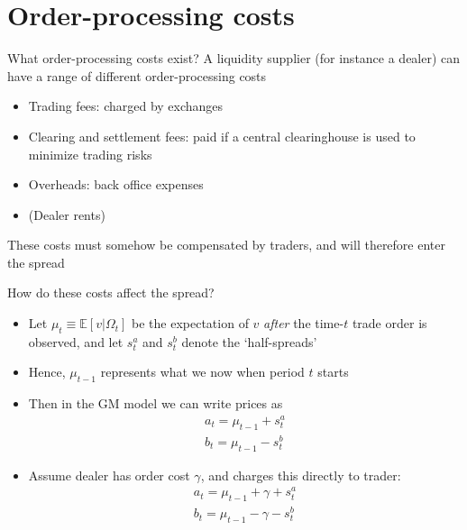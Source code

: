 \documentclass[english,10pt
,aspectratio=169
]{beamer}
\begin{document}
\section{Order-processing costs}

\begin{frame}{What order-processing costs exist?}
	A liquidity supplier (for instance a dealer) can have a range of different order-processing costs
	\begin{itemize}
		\item Trading fees:  charged by exchanges
		\item Clearing and settlement fees:  paid if a central clearinghouse is used to minimize trading risks
		\item Overheads: back office expenses
		\item (Dealer rents)
	\end{itemize}
	These costs must somehow be compensated by traders, and will therefore enter the spread
\end{frame}


\begin{frame}{How do these costs affect the spread?}
	\begin{itemize}
		\item Let $\mu_t \equiv \mathbb{E}[v | \Omega_t]$ be the expectation of $v$ \textit{after} the time-$t$ trade order is observed, and let $s^a_t$ and $s^b_t$ denote the `half-spreads'
		\item Hence, $\mu_{t-1}$ represents what we now when period $t$ starts
		\item  Then in the GM model  we can write prices as
		\begin{align*}
		a_{t} = \mu_{t-1} +s^{a}_{t} \\
		b_{t} = \mu_{t-1} - s^{b}_{t}
		\end{align*}
		\item Assume dealer has order cost $\gamma$, and charges this directly to trader:
		\begin{align*}
		a_{t} = \mu_{t-1} + \gamma + s^{a}_{t} \\
		b_{t} = \mu_{t-1} - \gamma - s^{b}_{t}
		\end{align*}
	\end{itemize}
\end{frame}
\end{document}
